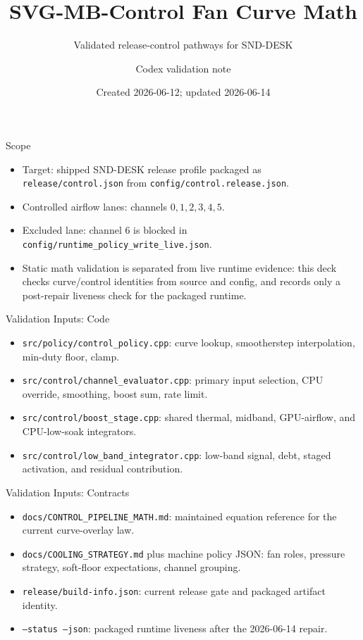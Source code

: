 \documentclass[aspectratio=169]{beamer}
\title{SVG-MB-Control Fan Curve Math}
\subtitle{Validated release-control pathways for SND-DESK}
\author{Codex validation note}
\date{Created 2026-06-12; updated 2026-06-14}
\newcommand{\cfg}{\texttt}
\begin{document}
\begin{frame}
  \titlepage
\end{frame}

\begin{frame}{Scope}
  \begin{itemize}
    \item Target: shipped SND-DESK release profile packaged as
      \cfg{release/control.json} from \cfg{config/control.release.json}.
    \item Controlled airflow lanes: channels $0,1,2,3,4,5$.
    \item Excluded lane: channel $6$ is blocked in
      \cfg{config/runtime\_policy\_write\_live.json}.
    \item Static math validation is separated from live runtime evidence: this
      deck checks curve/control identities from source and config, and records
      only a post-repair liveness check for the packaged runtime.
  \end{itemize}
\end{frame}

\begin{frame}{Validation Inputs: Code}
  \begin{itemize}
    \item \cfg{src/policy/control\_policy.cpp}: curve lookup, smootherstep
      interpolation, min-duty floor, clamp.
    \item \cfg{src/control/channel\_evaluator.cpp}: primary input selection,
      CPU override, smoothing, boost sum, rate limit.
    \item \cfg{src/control/boost\_stage.cpp}: shared thermal, midband,
      GPU-airflow, and CPU-low-soak integrators.
    \item \cfg{src/control/low\_band\_integrator.cpp}: low-band signal, debt,
      staged activation, and residual contribution.
  \end{itemize}
\end{frame}

\begin{frame}{Validation Inputs: Contracts}
  \begin{itemize}
    \item \cfg{docs/CONTROL\_PIPELINE\_MATH.md}: maintained equation reference
      for the current curve-overlay law.
    \item \cfg{docs/COOLING\_STRATEGY.md} plus machine policy JSON: fan roles,
      pressure strategy, soft-floor expectations, channel grouping.
    \item \cfg{release/build-info.json}: current release gate and packaged
      artifact identity.
    \item \cfg{--status --json}: packaged runtime liveness after the 2026-06-14
      repair.
  \end{itemize}
\end{frame}
\end{document}
